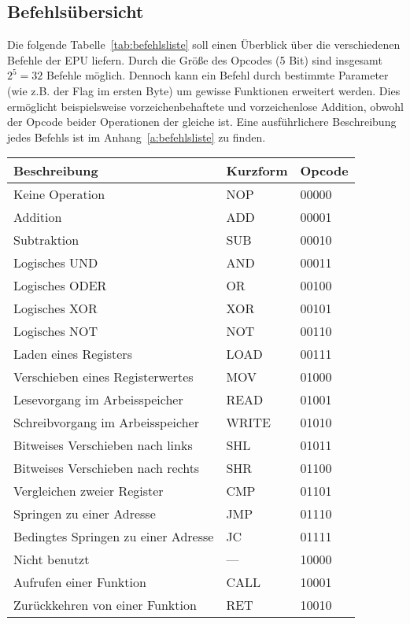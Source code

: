 \subsection{Befehlsübersicht}
Die folgende Tabelle~\ref{tab:befehlsliste} soll einen Überblick über die
verschiedenen Befehle der \ac{EPU} liefern. Durch die Größe des Opcodes (5 Bit)
sind insgesamt $2^5 = 32$ Befehle möglich. Dennoch kann ein Befehl durch
bestimmte Parameter (wie z.B. der Flag im ersten Byte) um gewisse Funktionen
erweitert werden. Dies ermöglicht beispielsweise vorzeichenbehaftete und
vorzeichenlose Addition, obwohl der Opcode beider Operationen der gleiche ist.
Eine ausführlichere Beschreibung jedes Befehls ist im
Anhang~\ref{a:befehlsliste} zu finden.
\begin{table}[htb]
\centering
\begin{tabular}{lll}
\toprule
Beschreibung									& Kurzform	& Opcode\\
\midrule
Keine Operation									& NOP		& 00000\\
Addition										& ADD   	& 00001\\
Subtraktion										& SUB   	& 00010\\
Logisches UND									& AND   	& 00011\\
Logisches ODER									& OR    	& 00100\\
Logisches XOR									& XOR   	& 00101\\
Logisches NOT									& NOT   	& 00110\\
Laden eines Registers							& LOAD  	& 00111\\
Verschieben eines Registerwertes				& MOV   	& 01000\\
Lesevorgang im Arbeisspeicher					& READ  	& 01001\\
Schreibvorgang im Arbeisspeicher				& WRITE 	& 01010\\
Bitweises Verschieben nach links				& SHL   	& 01011\\
Bitweises Verschieben nach rechts				& SHR   	& 01100\\
Vergleichen zweier Register						& CMP   	& 01101\\
Springen zu einer Adresse						& JMP   	& 01110\\
Bedingtes Springen zu einer Adresse				& JC    	& 01111\\
Nicht benutzt									& ---   	& 10000\\
Aufrufen einer Funktion							& CALL  	& 10001\\
Zurückkehren von einer Funktion					& RET   	& 10010\\

\end{tabular}
\end{table}
